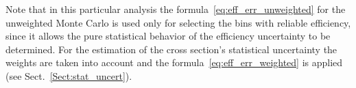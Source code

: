 Note that in this particular analysis the formula~\eqref{eq:eff_err_unweighted} for the unweighted Monte Carlo is used only for selecting the bins with reliable efficiency, since it allows the pure statistical behavior of the efficiency uncertainty to be determined. For the estimation of the cross section's statistical uncertainty the weights are taken into account and the formula~\eqref{eq:eff_err_weighted} is applied (see Sect.~\ref{Sect:stat_uncert}).




 
